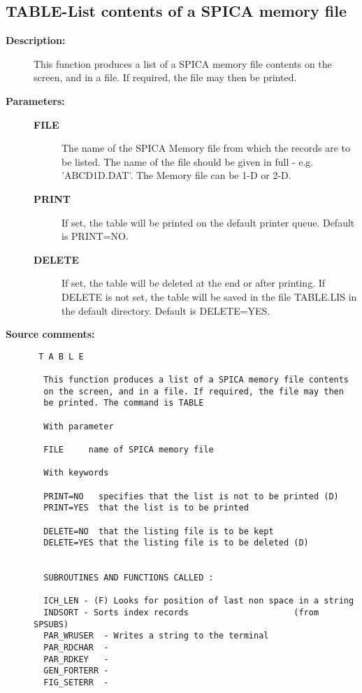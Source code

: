 \subsection{TABLE-\label{TABLE}List contents of a SPICA memory file}
\begin{description}

\item [{\bf Description:}]
 This function produces a list of a SPICA memory file contents
 on the screen, and in a file. If required, the file may then
 be printed.

\item [{\bf Parameters:}]
\begin{description}
\item [{\bf FILE}]
 The name of the SPICA Memory file from which the
 records are to be listed.  The name of the file should be
 given in full - e.g. 'ABCD1D.DAT'.  The Memory file can be
 1-D or 2-D.
\item [{\bf PRINT}]
 If set, the table will be printed on the default printer
 queue.  Default is PRINT=NO.
\item [{\bf DELETE}]
 If set, the table will be deleted at the end or after
 printing.  If DELETE is not set, the table will be
 saved in the file TABLE.LIS in the default directory.
 Default is DELETE=YES.
\end{description}

\item [{\bf Source comments:}]
\begin{verbatim}
 T A B L E

  This function produces a list of a SPICA memory file contents
  on the screen, and in a file. If required, the file may then
  be printed. The command is TABLE

  With parameter

  FILE     name of SPICA memory file

  With keywords

  PRINT=NO   specifies that the list is not to be printed (D)
  PRINT=YES  that the list is to be printed

  DELETE=NO  that the listing file is to be kept
  DELETE=YES that the listing file is to be deleted (D)


  SUBROUTINES AND FUNCTIONS CALLED :

  ICH_LEN - (F) Looks for position of last non space in a string
  INDSORT - Sorts index records                     (from SPSUBS)
  PAR_WRUSER  - Writes a string to the terminal
  PAR_RDCHAR  -
  PAR_RDKEY   -
  GEN_FORTERR -
  FIG_SETERR  -



\end{verbatim}
\end{description}
